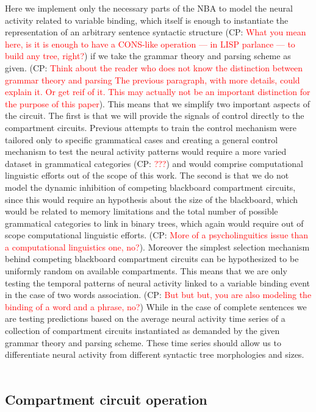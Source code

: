 \documentclass[10pt]{article}
\newcommand{\noteCP}[1]{(CP: \textcolor{red}{#1})}
\begin{document}
Here we implement only the necessary parts of the NBA to model the neural activity related to variable binding, which itself is enough to instantiate the representation of an arbitrary sentence syntactic structure
\noteCP{What you mean here, is it is enough to have a CONS-like operation --- in LISP parlance --- to build any tree, right?}
if we take the grammar theory and parsing scheme as given.
\noteCP{Think about the reader who does not know the distinction between grammar theory and parsing The previous paragraph, with more details, could explain it.
Or get reif of it.
This may actually not be an important distinction for the purpose of this paper}.
This means that we simplify two important aspects of the circuit.
The first is that we will provide the signals of control directly to the compartment circuits.
Previous attempts to train the control mechanism\cite{van_der_Velde_2010} were tailored only to specific grammatical cases and creating a general control mechanism to test the neural activity patterns would require a more varied dataset in grammatical categories
\noteCP{???}
and would comprise computational linguistic efforts out of the scope of this work.
The second is that we do not model the dynamic inhibition of competing blackboard compartment circuits, since this would require an hypothesis about the size of the blackboard, which would be related to memory limitations and the total number of possible grammatical categories to link in binary trees, which again would require out of scope computational linguistic efforts.
\noteCP{More of a psycholinguitics issue than a computational linguistics one, no?}.
Moreover the simplest selection mechanism behind competing blackboard compartment circuits can be hypothesized to be uniformly random on available compartments.
This means that we are only testing the temporal patterns of neural activity linked to a variable binding event in the case of two words association.
\noteCP{But but but, you are also modeling the binding of a word and a phrase, no?}
While in the case of complete sentences we are testing predictions based on the average neural activity time series of a collection of compartment circuits instantiated as demanded by the given grammar theory and parsing scheme.
These time series should allow us to differentiate neural activity from different syntactic tree morphologies and sizes.\\~\\



\subsection{Compartment circuit operation}
\end{document}
